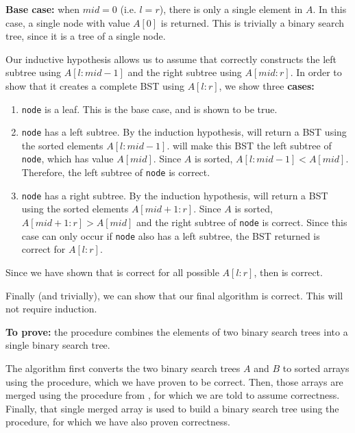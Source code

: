 \documentclass[11pt]{article}
\begin{document}
\textbf{Base case:} when $mid=0$ (i.e. $l=r$), there is only a single element
in $A$. In this case, a single node with value $A[0]$ is returned. This is 
trivially a binary search tree, since it is a tree of a single node.

Our inductive hypothesis allows us to assume that  correctly
constructs the left subtree using $A[l:mid-1]$ and the right subtree using
$A[mid:r]$. In order to show that it creates a complete BST using $A[l:r]$, 
we show three \textbf{cases:}

\begin{enumerate}
    \item \texttt{node} is a leaf. This is the base case, and is shown to be
        true.
    \item \texttt{node} has a left subtree. By the induction hypothesis, 
         will return a BST using the sorted elements
        $A[l:mid-1]$.  will make this BST the left subtree
        of \texttt{node}, which has value $A[mid]$. Since $A$ is sorted,
        $A[l:mid-1] < A[mid]$. Therefore, the left subtree of \texttt{node} is
        correct.
    \item \texttt{node}  has a right subtree. By the induction hypothesis,
         will return a BST using the sorted elements
        $A[mid+1:r]$. Since $A$ is sorted, $A[mid+1:r]>A[mid]$ and the right
        subtree of \texttt{node} is correct. Since this case can only occur
        if \texttt{node} also has a left subtree, the BST returned is correct
        for $A[l:r]$.
\end{enumerate} 

Since we have shown that  is correct for all possible 
$A[l:r]$, then  is correct.

Finally (and trivially), we can show that our final algorithm 
is correct. This will not require induction.

\textbf{To prove:} the  procedure combines the elements of
two binary search trees into a single binary search tree.

The algorithm first converts the two binary search trees $A$ and $B$ to sorted
arrays using the  procedure, which we have proven to be correct.
Then, those arrays are merged using the  procedure from 
, for which we are told to assume correctness. Finally,
that single merged array is used to build a binary search tree using the
 procedure, for which we have also proven correctness.
\end{document}
